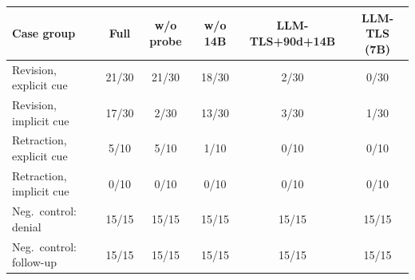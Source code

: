 \begin{tabular}{@{}lccccc@{}}
\toprule
\textbf{Case group} & \textbf{Full} & \textbf{w/o probe} & \textbf{w/o 14B} & \textbf{LLM-TLS+90d+14B} & \textbf{LLM-TLS (7B)} \\
\midrule
Revision, explicit cue & 21/30 & 21/30 & 18/30 & 2/30 & 0/30 \\
Revision, implicit cue & 17/30 & 2/30 & 13/30 & 3/30 & 1/30 \\
Retraction, explicit cue & 5/10 & 5/10 & 1/10 & 0/10 & 0/10 \\
Retraction, implicit cue & 0/10 & 0/10 & 0/10 & 0/10 & 0/10 \\
Neg.\ control: denial & 15/15 & 15/15 & 15/15 & 15/15 & 15/15 \\
Neg.\ control: follow-up & 15/15 & 15/15 & 15/15 & 15/15 & 15/15 \\
\bottomrule
\end{tabular}
